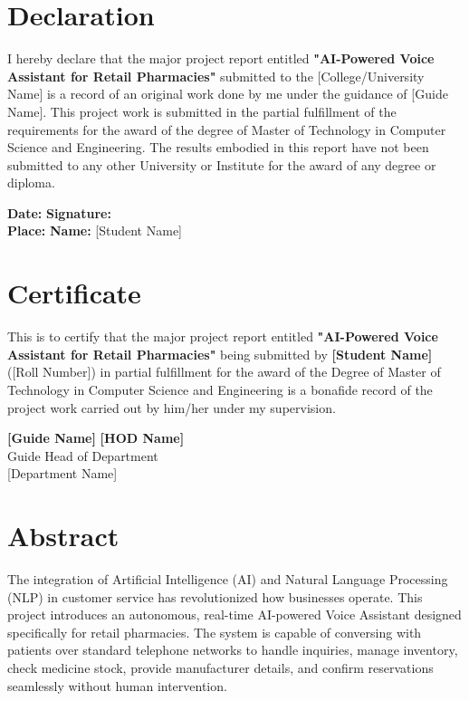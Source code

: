 \documentclass[12pt,a4paper]{report}
\begin{document}
\chapter*{Declaration}
I hereby declare that the major project report entitled \textbf{"AI-Powered Voice Assistant for Retail Pharmacies"} submitted to the [College/University Name] is a record of an original work done by me under the guidance of [Guide Name]. This project work is submitted in the partial fulfillment of the requirements for the award of the degree of Master of Technology in Computer Science and Engineering. The results embodied in this report have not been submitted to any other University or Institute for the award of any degree or diploma.

\vspace{2cm}
\noindent
\textbf{Date:} \hspace{8cm} \textbf{Signature:} \\
\textbf{Place:} \hspace{7.8cm} \textbf{Name:} [Student Name]

\newpage

\chapter*{Certificate}
This is to certify that the major project report entitled \textbf{"AI-Powered Voice Assistant for Retail Pharmacies"} being submitted by \textbf{[Student Name]} ([Roll Number]) in partial fulfillment for the award of the Degree of Master of Technology in Computer Science and Engineering is a bonafide record of the project work carried out by him/her under my supervision. 

\vspace{3cm}
\noindent
\textbf{[Guide Name]} \hspace{6cm} \textbf{[HOD Name]} \\
Guide \hspace{8.5cm} Head of Department \\
[Department Name] \hspace{6cm} [Department Name]

\newpage

\chapter*{Abstract}
The integration of Artificial Intelligence (AI) and Natural Language Processing (NLP) in customer service has revolutionized how businesses operate. This project introduces an autonomous, real-time AI-powered Voice Assistant designed specifically for retail pharmacies. The system is capable of conversing with patients over standard telephone networks to handle inquiries, manage inventory, check medicine stock, provide manufacturer details, and confirm reservations seamlessly without human intervention. 
\end{document}
